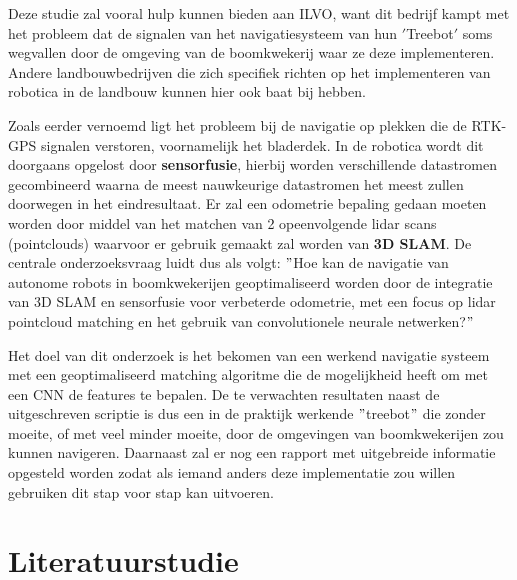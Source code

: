 Deze studie zal vooral hulp kunnen bieden aan ILVO, want dit bedrijf kampt met het probleem dat de signalen van het navigatiesysteem van hun \('\)Treebot\('\) soms wegvallen door de omgeving van de boomkwekerij waar ze deze implementeren.
Andere landbouwbedrijven die zich specifiek richten op het implementeren van robotica in de landbouw kunnen hier ook baat bij hebben.\newline

Zoals eerder vernoemd ligt het probleem bij de navigatie op plekken die de RTK-GPS signalen verstoren, voornamelijk het bladerdek.
In de robotica wordt dit doorgaans opgelost door \textbf{sensorfusie}, hierbij worden verschillende datastromen gecombineerd waarna de meest nauwkeurige datastromen het meest zullen doorwegen in het eindresultaat.
Er zal een odometrie bepaling gedaan moeten worden door middel van het matchen van 2 opeenvolgende lidar scans (pointclouds) waarvoor er gebruik gemaakt zal worden van \textbf{3D SLAM}.
De centrale onderzoeksvraag luidt dus als volgt: \("\)Hoe kan de navigatie van autonome robots in boomkwekerijen geoptimaliseerd worden door de integratie van 3D SLAM en sensorfusie voor verbeterde odometrie, met een focus op lidar pointcloud matching en het gebruik van convolutionele neurale netwerken?\("\)\newline

Het doel van dit onderzoek is het bekomen van een werkend navigatie systeem met een geoptimaliseerd matching algoritme die de mogelijkheid heeft om met een CNN de features te bepalen.
De te verwachten resultaten naast de uitgeschreven scriptie is dus een in de praktijk werkende \("\)treebot\("\) die zonder moeite, of met veel minder moeite, door de omgevingen van boomkwekerijen zou kunnen navigeren.
Daarnaast zal er nog een rapport met uitgebreide informatie opgesteld worden zodat als iemand anders deze implementatie zou willen gebruiken dit stap voor stap kan uitvoeren.


\section{Literatuurstudie}%
\label{sec:Literatuurstudie}

